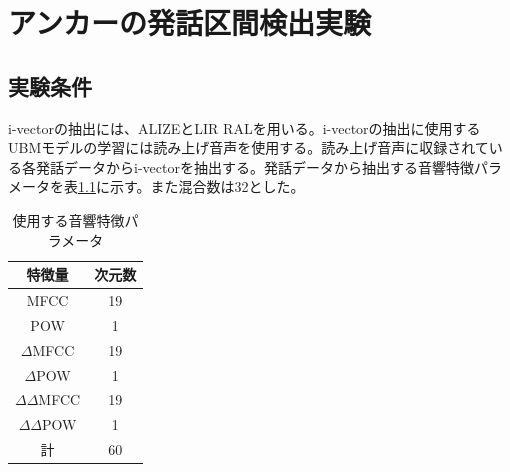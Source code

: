 \chapter{アンカーの発話区間検出実験}
\label{chapter:get_anchor}

\section{実験条件}
i-vectorの抽出には、ALIZEとLIR RAL\cite{alize}を用いる。i-vectorの抽出に使用するUBMモデルの学習には読み上げ音声\cite{ATR}を使用する。読み上げ音声に収録されている各発話データからi-vectorを抽出する。発話データから抽出する音響特徴パラメータを表\ref{iv_feature2}に示す。また混合数は32とした。\par

\begin{table}[H]
  \begin{center}
    \caption{使用する音響特徴パラメータ \label{iv_feature2}}
    \begin{tabular}{|c||c|} \hline
      特徴量 & 次元数\\ \hline
      MFCC & 19  \\ 
      POW & 1  \\ 
      $\Delta$MFCC & 19 \\ 
      $\Delta$POW & 1 \\ 
      $\Delta\Delta$MFCC & 19 \\ 
      $\Delta\Delta$POW & 1 \\ \hline
      計 & 60 \\ \hline
    \end{tabular}
  \end{center}
\end{table}

